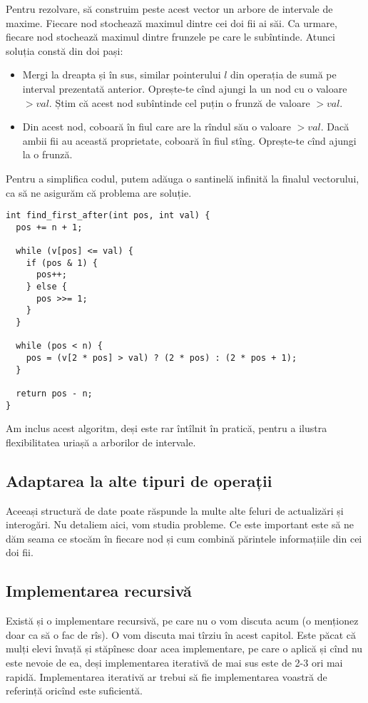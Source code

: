 Pentru rezolvare, să construim peste acest vector un arbore de intervale de maxime. Fiecare nod stochează maximul dintre cei doi fii ai săi. Ca urmare, fiecare nod stochează maximul dintre frunzele pe care le subîntinde. Atunci soluția constă din doi pași:

\begin{itemize}
  \item Mergi la dreapta și în sus, similar pointerului $l$ din operația de sumă pe interval prezentată anterior. Oprește-te cînd ajungi la un nod cu o valoare $> val$. Știm că acest nod subîntinde cel puțin o frunză de valoare $> val$.
  \item Din acest nod, coboară în fiul care are la rîndul său o valoare $> val$. Dacă ambii fii au această proprietate, coboară în fiul stîng. Oprește-te cînd ajungi la o frunză.
\end{itemize}

Pentru a simplifica codul, putem adăuga o santinelă infinită la finalul vectorului, ca să ne asigurăm că problema are soluție.

\begin{verbatim}
int find_first_after(int pos, int val) {
  pos += n + 1;

  while (v[pos] <= val) {
    if (pos & 1) {
      pos++;
    } else {
      pos >>= 1;
    }
  }

  while (pos < n) {
    pos = (v[2 * pos] > val) ? (2 * pos) : (2 * pos + 1);
  }

  return pos - n;
}
\end{verbatim}

Am inclus acest algoritm, deși este rar întîlnit în pratică, pentru a ilustra flexibilitatea uriașă a arborilor de intervale.

\subsection{Adaptarea la alte tipuri de operații}

Aceeași structură de date poate răspunde la multe alte feluri de actualizări și interogări. Nu detaliem aici, vom studia probleme. Ce este important este să ne dăm seama ce stocăm în fiecare nod și cum combină părintele informațiile din cei doi fii.

\subsection{Implementarea recursivă}

Există și o implementare recursivă, pe care nu o vom discuta acum (o menționez doar ca să o fac de rîs). O vom discuta mai tîrziu în acest capitol. Este păcat că mulți elevi învață și stăpînesc doar acea implementare, pe care o aplică și cînd nu este nevoie de ea, deși implementarea iterativă de mai sus este de 2-3 ori mai rapidă. Implementarea iterativă ar trebui să fie implementarea voastră de referință oricînd este suficientă.

